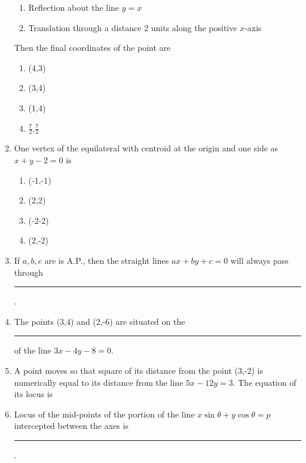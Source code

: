 \begin{enumerate}[label=\thesubsection.\arabic*,ref=\thesubsection.\theenumi]
\begin{enumerate}
\item Reflection about the line $y=x$
\item Translation through a distance 2 units along the positive $x$-axis 
\end{enumerate}
Then the final coordinates of the point are
\begin{enumerate}
\item (4,3)
\item (3,4)
\item (1,4)
\item $\frac{7}{2}$,$\frac{7}{2}$
\end{enumerate}
\item One vertex of the equilateral with centroid at the origin and one side as $x+y-2=0$ is
\begin{enumerate}
\item (-1,-1)
\item (2,2)
\item (-2-2)
\item (2,-2)
\end{enumerate}
\item If $a,b,c$ are is A.P., then the straight lines $ax+by+c=0$ will always pass through \rule{1cm}{0.15mm}.
\item The points (3,4) and (2,-6) are situated on the \rule{1cm}{0.15mm} of the line $3x-4y-8=0$.
\item A point moves so that square of its distance from the point (3,-2) is numerically equal to its distance from the line $5x-12y=3$. The equation of its locus is %
\item Locus of the mid-points of the portion of the line $x\sin\theta+y\cos\theta=p$ intercepted between the axes is \rule{1cm}{0.15mm}.


\end{enumerate}
